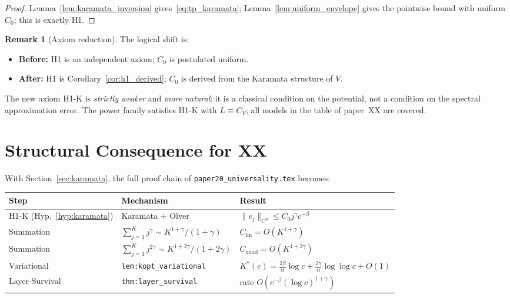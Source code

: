 \documentclass[12pt,a4paper]{amsart}
\theoremstyle{definition}
\newtheorem{remark}[theorem]{Remark}
\begin{document}
\begin{proof}
Lemma~\ref{lem:karamata_inversion} gives~\eqref{eq:tp_karamata};
Lemma~\ref{lem:uniform_envelope} gives the pointwise bound
with uniform $C_0$; this is exactly H1.
\end{proof}

\begin{remark}[Axiom reduction]
\label{rem:axiom_reduction}
The logical shift is:
\begin{itemize}[nosep]
  \item \textbf{Before:} H1 is an independent axiom;
    $C_0$ is postulated uniform.
  \item \textbf{After:} H1 is Corollary~\ref{cor:h1_derived};
    $C_0$ is derived from the Karamata structure of $V$.
\end{itemize}
The new axiom H1-K is \emph{strictly weaker} and \emph{more natural}:
it is a classical condition on the potential,
not a condition on the spectral approximation error.
The power family satisfies H1-K with $L\equiv C_V$;
all models in the table of paper~XX are covered.
\end{remark}

\section{Structural Consequence for XX}
\label{sec:consequence}

With Section~\ref{sec:karamata}, the full proof chain of
\texttt{paper20\_universality.tex} becomes:

\begin{center}
\renewcommand{\arraystretch}{1.4}
\begin{tabular}{l l l}
\toprule
\textbf{Step} & \textbf{Mechanism} & \textbf{Result} \\
\midrule
H1-K (Hyp.~\ref{hyp:karamata})
  & Karamata + Olver
  & $\|e_j\|_{C^0}\leq C_0 j^\gamma c^{-\beta}$\\
Summation
  & $\sum_{j=1}^K j^\gamma\sim K^{1+\gamma}/(1+\gamma)$
  & $C_{\mathrm{lin}}=O(K^{1+\gamma})$ \\
Summation
  & $\sum_{j=1}^K j^{2\gamma}\sim K^{1+2\gamma}/(1+2\gamma)$
  & $C_{\mathrm{quad}}=O(K^{1+2\gamma})$ \\
Variational
  & \texttt{lem:kopt\_variational}
  & $K^*(c)=\frac{2\beta}{\alpha}\log c + \frac{2\gamma}{\alpha}\log\log c + O(1)$ \\
Layer-Survival
  & \texttt{thm:layer\_survival}
  & rate $O(c^{-\beta}(\log c)^{1+\gamma})$ \\
\bottomrule
\end{tabular}
\end{center}
\end{document}

